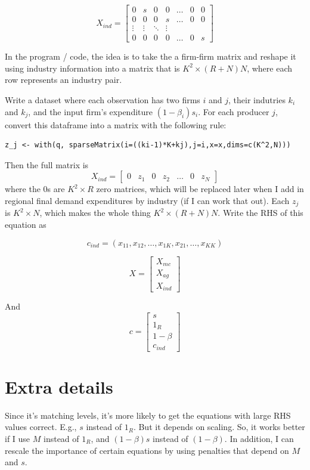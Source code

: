 \documentclass[12pt]{article}
\begin{document}
\[
X_{ind} =
\begin{bmatrix}
    0  & s &  0 & 0 &\dots  &  0 & 0 \\
    0 & 0  & 0 &  s & \dots  & 0 & 0 \\
    \vdots & \vdots & \ddots & \vdots \\
    0 & 0  & 0 & 0  & \dots  &  0 & s
\end{bmatrix}
\]

In the program / code, the idea is to take the a firm-firm matrix and reshape it using industry information into a matrix that is $K^2 \times (R+N)N$, where each row represents an industry pair. 

Write a dataset where each observation has two firms $i$ and $j$, their indutries $k_i$ and $k_j$, and the input firm's expenditure $(1-\beta_i) s_i$.  For each producer $j$, convert this dataframe into a matrix with the following rule:

\begin{verbatim}
z_j <- with(q, sparseMatrix(i=((ki-1)*K+kj),j=i,x=x,dims=c(K^2,N)))
\end{verbatim}

Then the full matrix is
\[
X_{ind} =
\begin{bmatrix}
    0  & z_1 &  0 & z_2 &\dots  &  0 & z_N 
\end{bmatrix}
\]
where the 0s are $K^2 \times R$ zero matrices, which will be replaced later when I add in regional final demand expenditures by industry (if I can work that out). Each $z_j$ is $K^2 \times N$, which makes the whole thing $K^2 \times (R+N)N$. Write the RHS of this equation as

\[
c_{ind} = ( x_{11} , x_{12} , \dots , x_{1K}, x_{21}, \dots, x_{KK} )
\]

\[
X = 
\begin{bmatrix}
X_{mc} \\
X_{ag} \\
X_{ind}
\end{bmatrix}
\]

And 
\[
c = 
\begin{bmatrix}
s \\
1_R \\
1 -\beta \\
c_{ind}
\end{bmatrix}
\]

\section{Extra details}
Since it's matching levels, it's more likely to get the equations with large RHS values correct. E.g., $s$ instead of $1_R$. But it depends on scaling. So, it works better if I use $M$ instead of $1_R$, and $(1-\beta)s$ instead of $(1-\beta)$. In addition, I can rescale the importance of certain equations by using penalties that depend on $M$ and $s$.
\end{document}
